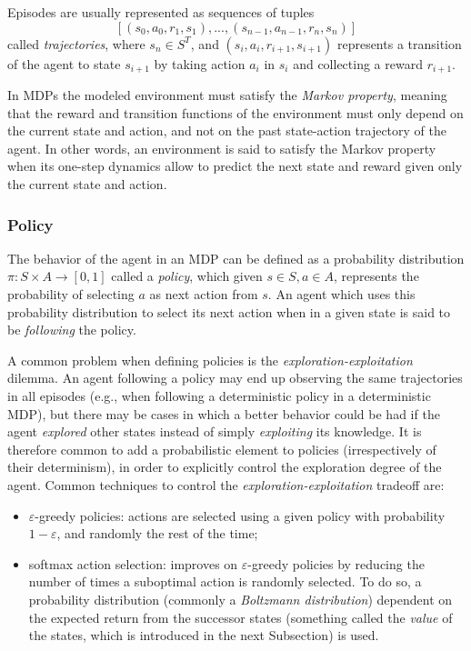 Episodes are usually represented as sequences of tuples 
\[
    [(s_0, a_0, r_1, s_1), ..., (s_{n-1}, a_{n-1}, r_n, s_n)]
\]
called \textit{trajectories}, where $s_n \in S^T$, and $(s_i, a_i, r_{i+1}, s_{i+1})$ 
represents a transition of the agent to state $s_{i+1}$ by taking action $a_i$ 
in $s_i$ and collecting a reward $r_{i+1}$.

In MDPs the modeled environment must satisfy the \textit{Markov property}, 
meaning that the reward and transition functions of the environment must only 
depend on the current state and action, and not on the past state-action 
trajectory of the agent.
In other words, an environment is said to satisfy the Markov property when its 
one-step dynamics allow to predict the next state and reward given only the 
current state and action.

\subsubsection{Policy}
The behavior of the agent in an MDP can be defined as a probability 
distribution $\pi: S \times A \rightarrow [0,1]$ called a \textit{policy}, 
which given $s \in S, a \in A$, represents the probability of selecting $a$ as 
next action from $s$.
An agent which uses this probability distribution to select its next action 
when in a given state is said to be \textit{following} the policy.

A common problem when defining policies is the \textit{exploration-exploitation}
dilemma. An agent following a policy may end up observing the same trajectories 
in all episodes (e.g., when following a deterministic policy in a deterministic 
MDP), but there may be cases in which a better behavior could be had if the 
agent \textit{explored} other states instead of simply \textit{exploiting} its 
knowledge. 
It is therefore common to add a probabilistic element to policies 
(irrespectively of their determinism), in order to explicitly control the 
exploration degree of the agent. Common techniques to control the 
\textit{exploration-exploitation} tradeoff are:
%
\begin{itemize}
    \item $\varepsilon$-greedy policies: actions are selected using a given 
    policy with probability $1-\varepsilon$, and randomly the rest of the time;
    \item softmax action selection: improves on $\varepsilon$-greedy policies by 
    reducing the number of times a suboptimal action is randomly selected. To do
    so, a probability distribution (commonly a \textit{Boltzmann distribution}) 
    dependent on the expected return from the successor states (something called
    the \textit{value} of the states, which is introduced in the next Subsection)
    is used.
\end{itemize}
%
